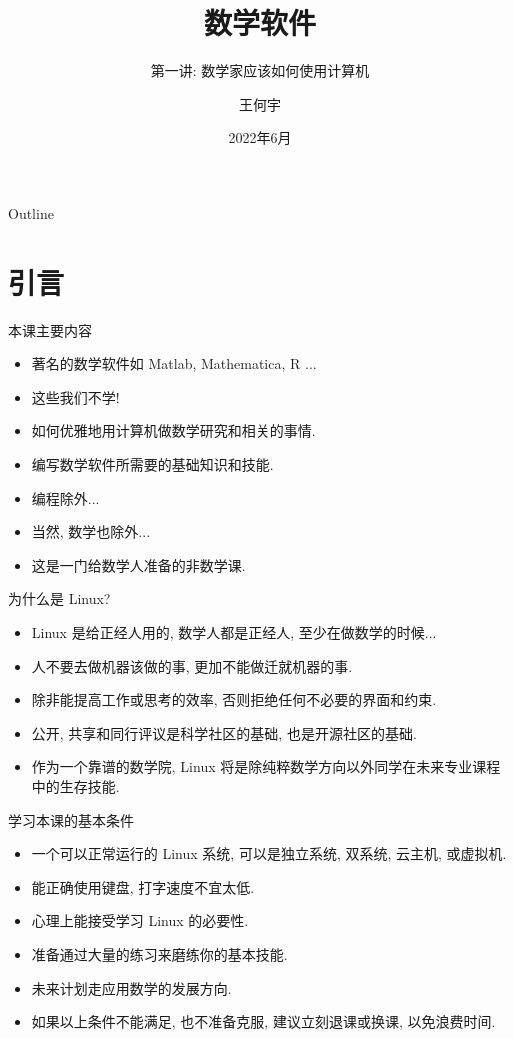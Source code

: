 \documentclass{beamer}
\title[Beamer + xelatex] %
{\Huge 数学软件}
\subtitle
{第一讲: 数学家应该如何使用计算机} %
\author[Wang HY] %
{王何宇}
\institute[ZJU] %
{
  浙江大学数学科学学院\\
  信息与计算科学系
}
\date[] %
{2022年6月}
\begin{document}
\begin{frame}
 \titlepage
\end{frame}
\begin{frame}{Outline}
  \tableofcontents
\end{frame}

\section{引言}

\begin{frame}{本课主要内容}
  \begin{itemize}
  \item<1-> 著名的数学软件如 Matlab, Mathematica, R ...
  \item<2-> 这些我们不学!
  \item<3-> 如何优雅地用计算机做数学研究和相关的事情.
  \item<4-> 编写数学软件所需要的基础知识和技能.
  \item<5-> 编程除外...
  \item<6-> 当然, 数学也除外...
  \item<7-> 这是一门给数学人准备的非数学课.
  \end{itemize}
\end{frame}

\begin{frame}{为什么是 Linux?}
  \begin{itemize}
  \item<1-> Linux 是给正经人用的, 数学人都是正经人, 至少在做数学的时候... 
  \item<2-> 人不要去做机器该做的事, 更加不能做迁就机器的事.
  \item<3-> 除非能提高工作或思考的效率, 否则拒绝任何不必要的界面和约束. 
  \item<4-> 公开, 共享和同行评议是科学社区的基础, 也是开源社区的基础.
  \item<5-> 作为一个靠谱的数学院, Linux 将是除纯粹数学方向以外同学在未来专业课程中的生存技能.
  \end{itemize}
\end{frame}

\begin{frame}{学习本课的基本条件}
  \begin{itemize}
  \item<1-> 一个可以正常运行的 Linux 系统, 可以是独立系统, 双系统, 云主机, 或虚拟机.
  \item<2-> 能正确使用键盘, 打字速度不宜太低.
  \item<3-> 心理上能接受学习 Linux 的必要性. 
  \item<4-> 准备通过大量的练习来磨练你的基本技能.  
  \item<5-> 未来计划走应用数学的发展方向.
  \item<6-> 如果以上条件不能满足, 也不准备克服, 建议立刻退课或换课, 以免浪费时间.
  \end{itemize}
\end{frame}
\end{document}
